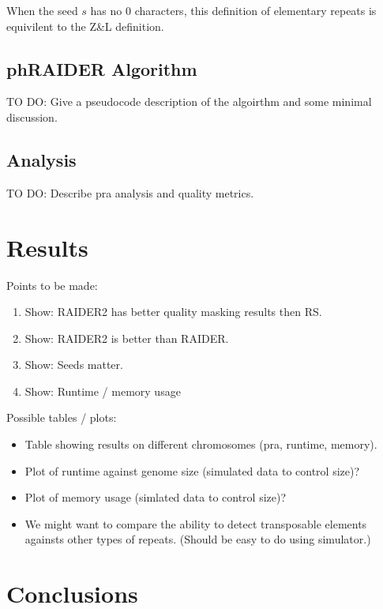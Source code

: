 \documentclass{bmcart}
\newcommand{\red}[1]{{\color{red}#1}}
\begin{document}
\begin{theorem} When the seed $s$ has no 0 characters, this
    definition of elementary repeats is equivilent to the Z\&L
    definition.
\end{theorem}

\subsection*{phRAIDER Algorithm}

\red{
TO DO: Give a pseudocode description of the algoirthm and some minimal
discussion.
}

\subsection*{Analysis}

\red{
TO DO: Describe pra analysis and quality metrics.
}


\section*{Results}

\red{
Points to be made:
\begin{enumerate}
\item Show: RAIDER2 has better quality masking results then RS.
\item Show: RAIDER2 is better than RAIDER.
\item Show: Seeds matter.
\item Show: Runtime / memory usage
\end{enumerate}


Possible tables / plots:
\begin{itemize}
\item Table showing results on different chromosomes (pra, runtime, memory).
\item Plot of runtime against genome size (simulated data to control size)?
\item Plot of memory usage (simlated data to control size)?
\item We might want to compare the ability to detect transposable
  elements againsts other types of repeats.  (Should be easy to do
  using simulator.)
\end{itemize}
}

\section*{Conclusions}
\end{document}
